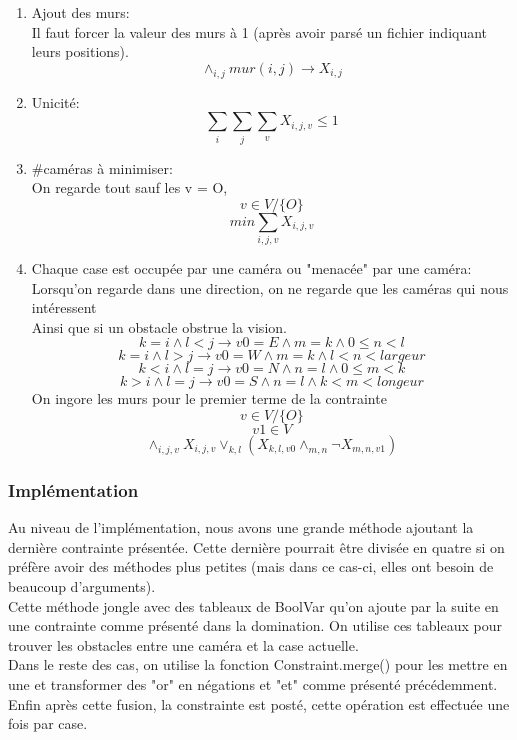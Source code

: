 \begin{enumerate}
    \item Ajout des murs:\\
    Il faut forcer la valeur des murs à 1 (après avoir parsé un fichier indiquant leurs positions).
    \[ \land_{i,j} mur (i,j) \longrightarrow  X_{i,j}\]
    
    \item Unicité:
    \[ \sum_{i} \sum_{j} \sum_{v} X_{i,j,v}  \leq 1 \]
    
    \item \#caméras à minimiser:\\
    On regarde tout sauf les v = O,
    \[  v \in V/\{O\}\]
    \[  min \sum_{i,j,v} X_{i,j,v} \]
    
    \item Chaque case est occupée par une caméra ou "menacée" par une caméra:\\
    Lorsqu'on regarde dans une direction, on ne regarde que les caméras qui nous intéressent\\
    Ainsi que si un obstacle obstrue la vision. 
    \[ k = i \land l < j \longrightarrow v0 = E \land m=k \land 0 \leq n < l\]
    \[ k = i \land l > j \longrightarrow v0 = W \land m=k \land l < n < largeur  \]
    \[ k < i \land l = j \longrightarrow v0 = N \land n=l \land 0 \leq m < k\]
    \[ k > i \land l = j \longrightarrow v0 = S \land n=l \land k < m < longeur  \]
    On ingore les murs pour le premier terme de la contrainte
    \[ v \in V/\{O\}\]
    \[ v1 \in V \]
    \[  \land_{i,j,v} X_{i,j,v} \lor_{k,l} ( X_{k,l,v0} \land_{m,n} \neg X_{m,n,v1} )\]
\end{enumerate}

\subsubsection{Implémentation}
Au niveau de l'implémentation, nous avons une grande méthode ajoutant la dernière contrainte présentée. Cette dernière pourrait être divisée en quatre si on préfère avoir des méthodes plus petites (mais dans ce cas-ci, elles ont besoin de beaucoup d'arguments).\\
Cette méthode jongle avec des tableaux de BoolVar qu'on ajoute par la suite en une contrainte comme présenté dans la domination. On utilise ces tableaux pour trouver les obstacles entre une caméra et la case actuelle.\\
Dans le reste des cas, on utilise la fonction Constraint.merge() pour les mettre en une et transformer des "or" en négations et "et" comme présenté précédemment. Enfin après cette fusion, la constrainte est posté, cette opération est effectuée une fois par case.